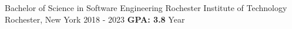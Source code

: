 \documentclass{awesome-cv}
\begin{document}
	\makecvheader[C]

	\makecvfooter
		{}
		{}
		{}


		\vspace{-0.1cm}
		\begin{cventries}
			\cventry
				{Bachelor of Science in Software Engineering}
				{Rochester Institute of Technology}
				{Rochester, New York}
				{2018 - 2023}
                {\textbf{GPA: 3.8}  Year}
		\end{cventries}
		
		\vspace{-0.2cm}

			\vspace{-0.15cm}
\end{document}
